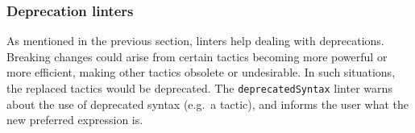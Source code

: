 \documentclass[runningheads]{llncs}
\def\mathlib{Mathlib\xspace}
\newcommand{\lean}[1]{\texttt{#1}}
\begin{document}





\subsubsection{Deprecation linters} As mentioned in the previous section, linters help dealing with deprecations. Breaking changes could arise from certain tactics becoming more powerful or more efficient, making other tactics obsolete or undesirable. In such situations, the replaced tactics would be deprecated.
The \lean{deprecatedSyntax} linter warns about the use of deprecated syntax (e.g.\ a tactic), and informs the user what the new preferred expression is.
\end{document}
